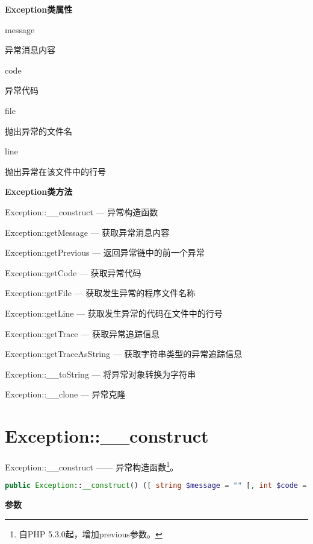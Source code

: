 \textbf{Exception类属性}

\begin{compactitem}
\item message

异常消息内容
\item code

异常代码
\item file

抛出异常的文件名
\item line

抛出异常在该文件中的行号

\end{compactitem}



\textbf{Exception类方法}

\begin{compactitem}
\item Exception::\_\_construct — 异常构造函数
\item Exception::getMessage — 获取异常消息内容
\item Exception::getPrevious — 返回异常链中的前一个异常
\item Exception::getCode — 获取异常代码
\item Exception::getFile — 获取发生异常的程序文件名称
\item Exception::getLine — 获取发生异常的代码在文件中的行号
\item Exception::getTrace — 获取异常追踪信息
\item Exception::getTraceAsString — 获取字符串类型的异常追踪信息
\item Exception::\_\_toString — 将异常对象转换为字符串
\item Exception::\_\_clone — 异常克隆
\end{compactitem}

\section{Exception::\_\_construct}


Exception::\_\_construct —— 异常构造函数\footnote{自PHP 5.3.0起，增加previous参数。}。


\begin{lstlisting}[language=PHP]
public Exception::__construct() ([ string $message = "" [, int $code = 0 [, Exception $previous = NULL ]]] )
\end{lstlisting}




\textbf{参数}

